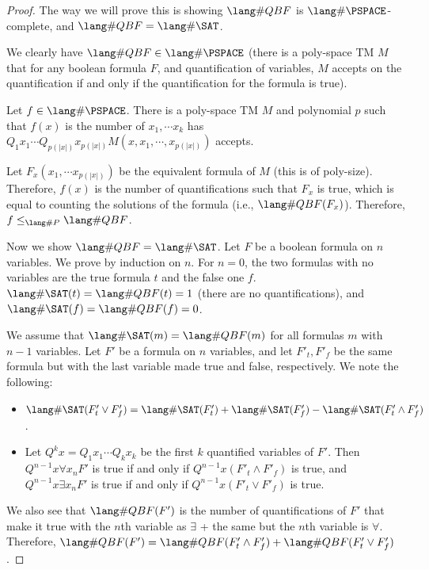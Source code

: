 \begin{proof}
The way we will prove this is showing $\SharpQBF$ is $\SharpPSPACE$-complete, and $\SharpQBF = \SharpSAT$.

We clearly have $\SharpQBF \in \SharpPSPACE$ (there is a poly-space TM $M$ that for any boolean formula $F$, and quantification of variables, $M$ accepts on the quantification if and only if the quantification for the formula is true).

\par Let $f \in \SharpPSPACE$. There is a poly-space TM $M$ and polynomial $p$ such that $f(x)$ is the number of $x_1, \cdots x_k$ has $Q_1x_1\cdots Q_{p(|x|)}x_{p(|x|)} M(x, x_1, \cdots, x_{p(|x|)})$ accepts.

\par Let $F_x(x_1, \cdots x_{p(|x|)})$ be the equivalent formula of $M$ (this is of poly-size). Therefore, $f(x)$ is the number of quantifications such that $F_x$ is true, which is equal to counting the solutions of the formula (i.e., $\SharpQBF(F_x)$). Therefore, $f \le_{\SharpP} \SharpQBF$. 

\par Now we show $\SharpQBF = \SharpSAT$. Let $F$ be a boolean formula on $n$ variables. We prove by induction on $n$. For $n=0$, the two formulas with no variables are the true formula $t$ and the false one $f$. $\SharpSAT(t) = \SharpQBF(t) = 1$ (there are no quantifications), and $\SharpSAT(f) = \SharpQBF(f) = 0$. 

\par We assume that $\SharpSAT(m) = \SharpQBF(m)$ for all formulas $m$ with $n-1$ variables. Let $F'$ be a formula on $n$ variables, and let $F'_t, F'_f$ be the same formula but with the last variable made true and false, respectively. We note the following:
\begin{itemize}
\item $\SharpSAT(F'_t \vee F'_f) = \SharpSAT(F'_t) + \SharpSAT(F'_f) - \SharpSAT(F'_t \wedge F'_f)$.
\item Let $Q^kx = Q_1x_1 \cdots Q_kx_k$ be the first $k$ quantified variables of $F'$. Then $Q^{n-1}x\forall x_n F'$ is true if and only if $Q^{n-1}x(F'_t \wedge F'_f)$ is true, and $Q^{n-1}x\exists x_n F'$ is true if and only if $Q^{n-1}x(F'_t \vee F'_f)$ is true. 
\end{itemize}
We also see that $\SharpQBF(F')$ is the number of quantifications of $F'$ that make it true with the $n$th variable as $\exists$ + the same but the $n$th variable is $\forall$. Therefore, $\SharpQBF(F') = \SharpQBF(F'_t \wedge F'_f) + \SharpQBF(F'_t \vee F'_f)$.


\end{proof}
